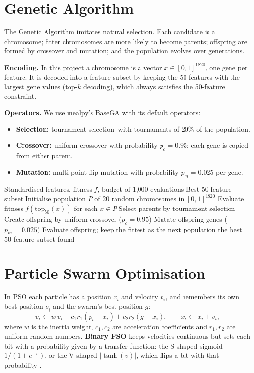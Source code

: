\documentclass[12pt,a4paper]{report}
\begin{document}
\section{Genetic Algorithm}
The Genetic Algorithm \cite{holland1975} imitates natural selection. Each candidate is a chromosome; fitter
chromosomes are more likely to become parents; offspring are formed by crossover and mutation; and the population
evolves over generations.

\textbf{Encoding.} In this project a chromosome is a vector $x \in [0,1]^{1820}$, one gene per feature. It is decoded
into a feature subset by keeping the 50 features with the largest gene values (top-$k$ decoding), which always
satisfies the 50-feature constraint.

\textbf{Operators.} We use mealpy's BaseGA \cite{vanthieu2023} with its default operators:
\begin{itemize}
  \item \textbf{Selection:} tournament selection, with tournaments of 20\% of the population.
  \item \textbf{Crossover:} uniform crossover with probability $p_c = 0.95$; each gene is copied from either parent.
  \item \textbf{Mutation:} multi-point flip mutation with probability $p_m = 0.025$ per gene.
\end{itemize}

\begin{algorithm}[H]
\caption{Genetic Algorithm for feature selection}
\begin{algorithmic}[1]
\REQUIRE Standardised features, fitness $f$, budget of 1,000 evaluations
\ENSURE Best 50-feature subset
\STATE Initialise population $P$ of 20 random chromosomes in $[0,1]^{1820}$
\STATE Evaluate fitness $f(\mathrm{top}_{50}(x))$ for each $x \in P$
  \STATE Select parents by tournament selection
  \STATE Create offspring by uniform crossover ($p_c = 0.95$)
  \STATE Mutate offspring genes ($p_m = 0.025$)
  \STATE Evaluate offspring; keep the fittest as the next population
\ENDFOR
\RETURN the best 50-feature subset found
\end{algorithmic}
\end{algorithm}

\section{Particle Swarm Optimisation}
In PSO \cite{kennedy1995} each particle has a position $x_i$ and velocity $v_i$, and remembers its own best position
$p_i$ and the swarm's best position $g$:
\begin{equation}
v_i \leftarrow w\,v_i + c_1 r_1 (p_i - x_i) + c_2 r_2 (g - x_i), \qquad x_i \leftarrow x_i + v_i ,
\end{equation}
where $w$ is the inertia weight, $c_1, c_2$ are acceleration coefficients and $r_1, r_2$ are uniform random numbers.
\textbf{Binary PSO} keeps velocities continuous but sets each bit with a probability given by a transfer function:
the S-shaped sigmoid $1/(1 + e^{-v})$, or the V-shaped $|\tanh(v)|$, which flips a bit with that probability
\cite{mirjalili2013}.
\end{document}
